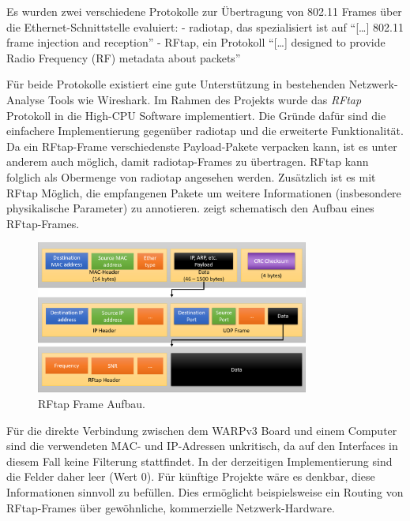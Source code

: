 \documentclass[letterpaper,11pt,ngerman]{article}
\begin{document}
\begin{onehalfspace}
Es wurden zwei verschiedene Protokolle zur Übertragung von 802.11 Frames
über die Ethernet-Schnittstelle evaluiert: - radiotap, das spezialisiert
ist auf ``{[}\ldots{}{]} 802.11 frame injection and
reception''\autocite{radiotap} - RFtap, ein Protokoll ``{[}\ldots{}{]}
designed to provide Radio Frequency (RF) metadata about
packets''\autocite{rftap}

Für beide Protokolle existiert eine gute Unterstützung in bestehenden
Netzwerk-Analyse Tools wie Wireshark. Im Rahmen des Projekts wurde das
\emph{RFtap} Protokoll in die High-CPU Software implementiert. Die
Gründe dafür sind die einfachere Implementierung gegenüber radiotap und
die erweiterte Funktionalität. Da ein RFtap-Frame verschiedenste
Payload-Pakete verpacken kann, ist es unter anderem auch möglich, damit
radiotap-Frames zu übertragen. RFtap kann folglich als Obermenge von
radiotap angesehen werden. Zusätzlich ist es mit RFtap Möglich, die
empfangenen Pakete um weitere Informationen (insbesondere physikalische
Parameter) zu annotieren.  zeigt
schematisch den Aufbau eines RFtap-Frames.

\begin{figure}
\centering
\includegraphics[width=0.8\textwidth]{rftap.png}
\caption{RFtap Frame Aufbau.}\label{fig:rftap}
\end{figure}

Für die direkte Verbindung zwischen dem WARPv3 Board und einem Computer
sind die verwendeten MAC- und IP-Adressen unkritisch, da auf den
Interfaces in diesem Fall keine Filterung stattfindet. In der
derzeitigen Implementierung sind die Felder daher leer (Wert 0). Für
künftige Projekte wäre es denkbar, diese Informationen sinnvoll zu
befüllen. Dies ermöglicht beispielsweise ein Routing von RFtap-Frames
über gewöhnliche, kommerzielle Netzwerk-Hardware.


\end{onehalfspace}
\end{document}
